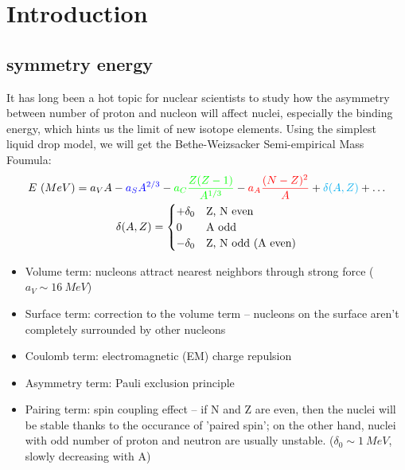 \section{Introduction}

\subsection{symmetry energy} 
It has long been a hot topic for nuclear scientists to study how the asymmetry 
between number of proton and nucleon will affect nuclei, especially the binding
energy, which hints us the limit of new isotope elements. Using the simplest 
liquid drop model, we will get the Bethe-Weizsacker Semi-empirical Mass Foumula:
\begin{equation}
    \label{eq:mass-foumula}
    \begin{gathered}
	E\ (MeV) = \textcolor{black}{a_V A} - \textcolor{blue}{a_S A^{2/3}} - \textcolor{green}{a_C\frac{Z(Z-1)}{A^{1/3}}} - \textcolor{red}{a_A\frac{(N-Z)^2}{A}} + \textcolor{cyan}{\delta(A, Z)} + \dots \\
	\delta(A, Z) = 
	    \begin{cases}
		+\delta_0	& \text{Z, N even} \\
		0		& \text{A odd}	\\
		-\delta_0	& \text{Z, N odd (A even)} \\
	    \end{cases}
    \end{gathered}
\end{equation}

\begin{itemize}
    \color{black} \item Volume term: nucleons attract nearest neighbors 
	through strong force ($a_V \sim 16\ MeV$)
    \color{blue}  \item Surface term: correction to the volume term -- nucleons 
	on the surface aren't completely surrounded by other nucleons
    \color{green} \item Coulomb term: electromagnetic (EM) charge repulsion
    \color{red}   \item Asymmetry term: Pauli exclusion principle
    \color{cyan}  \item Pairing term: spin coupling effect -- if N and Z are even,
	then the nuclei will be stable thanks to the occurance of 'paired spin';
	on the other hand, nuclei with odd number of proton and neutron are usually
	unstable. ($\delta_0 \sim 1\ MeV$, slowly decreasing with A)
\end{itemize}

